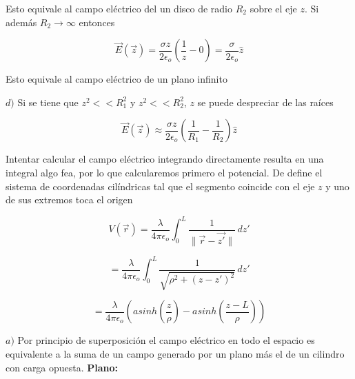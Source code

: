 Esto equivale al campo eléctrico del un disco de radio $R_2$ sobre el eje $z$. Si además $R_2 \longrightarrow \infty$ entonces

\[\Vec{E}(\Vec{z}) = \frac{\sigma z}{2\epsilon_o}\left( 
\frac{1}{z}-0
\right) = \frac{\sigma}{2\epsilon_o}\hat{z}\]

Esto equivale al campo eléctrico de un plano infinito

\medbreak

$d)$ Si se tiene que $z^2 << R_1^2$ y $z^2 << R_2^2$, $z$ se puede despreciar de las raíces

\[\Vec{E}(\Vec{z}) \approx \frac{\sigma z}{2\epsilon_o}\left( 
\frac{1}{R_1}-\frac{1}{R_2}
\right)\hat{z}\]

\bigbreak
{}\newline

Intentar calcular el campo eléctrico integrando directamente resulta en una integral algo fea, por lo que calcularemos primero el potencial. De define el sistema de coordenadas cilíndricas tal que el segmento coincide con el eje $z$ y uno de sus extremos toca el origen

\[V(\Vec{r}) = \frac{\lambda}{4\pi\epsilon_o}\int^L_0\frac{1}{\parallel\Vec{r} - \Vec{z'}\parallel}\,dz'\]

\[ = \frac{\lambda}{4\pi\epsilon_o}\int^L_0\frac{1}{\sqrt{\rho^2 + (z-z')^2}}\,dz'\]

\[=\frac{\lambda}{4\pi\epsilon_o}\left(
asinh\left(\frac{z}{\rho}\right)-
asinh\left(\frac{z-L}{\rho}\right)
\right)\]

\bigbreak
{}\newline\newline
$a)$ Por principio de superposición el campo eléctrico en todo el espacio es equivalente a la suma de un campo generado por un plano más el de un cilindro con carga opuesta.
\medbreak
\textbf{Plano:}
\medbreak


\newpage